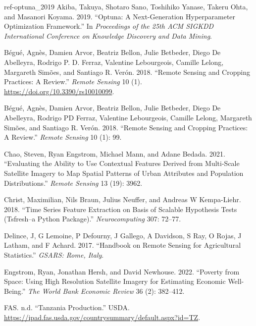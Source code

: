 \documentclass[
  journal,
  twocolumn]{IEEEtran}
\newlength{\cslhangindent}
\newlength{\cslentryspacingunit} %
\newenvironment{CSLReferences}[2] %
 {%
  \setlength{\parindent}{0pt}
  \ifodd #1
  \let\oldpar\par
  \def\par{\hangindent=\cslhangindent\oldpar}
  \fi
  \setlength{\parskip}{#2\cslentryspacingunit}
 }%
 {}
\newenvironment{cslreferences}[2]
 {\begin{CSLReferences}{#1}{#2}}
 {\end{CSLReferences}}
\begin{document}
\hypertarget{refs}{}
\begin{cslreferences}
\leavevmode\hypertarget{ref-optuna_2019}{}%
Akiba, Takuya, Shotaro Sano, Toshihiko Yanase, Takeru Ohta, and Masanori
Koyama. 2019. ``Optuna: A Next-Generation Hyperparameter Optimization
Framework.'' In \emph{Proceedings of the 25th ACM SIGKDD International
Conference on Knowledge Discovery and Data Mining}.

\leavevmode\hypertarget{ref-rs10010099}{}%
Bégué, Agnès, Damien Arvor, Beatriz Bellon, Julie Betbeder, Diego De
Abelleyra, Rodrigo P. D. Ferraz, Valentine Lebourgeois, Camille Lelong,
Margareth Simões, and Santiago R. Verón. 2018. ``Remote Sensing and
Cropping Practices: A Review.'' \emph{Remote Sensing} 10 (1).
\url{https://doi.org/10.3390/rs10010099}.

\leavevmode\hypertarget{ref-begue2018remote}{}%
Bégué, Agnès, Damien Arvor, Beatriz Bellon, Julie Betbeder, Diego De
Abelleyra, Rodrigo PD Ferraz, Valentine Lebourgeois, Camille Lelong,
Margareth Simões, and Santiago R. Verón. 2018. ``Remote Sensing and
Cropping Practices: A Review.'' \emph{Remote Sensing} 10 (1): 99.

\leavevmode\hypertarget{ref-chao2021evaluating}{}%
Chao, Steven, Ryan Engstrom, Michael Mann, and Adane Bedada. 2021.
``Evaluating the Ability to Use Contextual Features Derived from
Multi-Scale Satellite Imagery to Map Spatial Patterns of Urban
Attributes and Population Distributions.'' \emph{Remote Sensing} 13
(19): 3962.

\leavevmode\hypertarget{ref-christ2018time}{}%
Christ, Maximilian, Nils Braun, Julius Neuffer, and Andreas W
Kempa-Liehr. 2018. ``Time Series Feature Extraction on Basis of Scalable
Hypothesis Tests (Tsfresh--a Python Package).'' \emph{Neurocomputing}
307: 72--77.

\leavevmode\hypertarget{ref-delince2017handbook}{}%
Delince, J, G Lemoine, P Defourny, J Gallego, A Davidson, S Ray, O
Rojas, J Latham, and F Achard. 2017. ``Handbook on Remote Sensing for
Agricultural Statistics.'' \emph{GSARS: Rome, Italy}.

\leavevmode\hypertarget{ref-engstrom2022poverty}{}%
Engstrom, Ryan, Jonathan Hersh, and David Newhouse. 2022. ``Poverty from
Space: Using High Resolution Satellite Imagery for Estimating Economic
Well-Being.'' \emph{The World Bank Economic Review} 36 (2): 382--412.

\leavevmode\hypertarget{ref-cc_tanzania}{}%
FAS. n.d. ``Tanzania Production.'' USDA.
\url{https://ipad.fas.usda.gov/countrysummary/default.aspx?id=TZ}.


\end{cslreferences}
\end{document}
